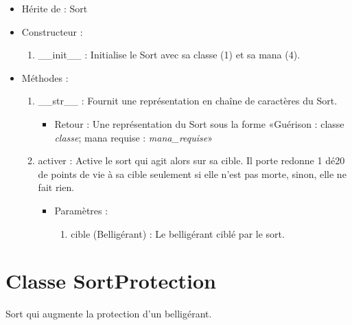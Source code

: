 \documentclass[12pt,pdftex,oneside]{article}
\begin{document}
  \begin{itemize}
  \item Hérite de : Sort


  \item Constructeur : 

  \begin{enumerate}
  \item \_\_init\_\_ : Initialise le Sort avec sa classe (1) et sa mana (4).

  \end{enumerate}

  \item Méthodes : 

    \begin{enumerate}
    \item __str__ : Fournit une représentation en chaîne de caractères du Sort.
      \begin{itemize}
      \item Retour : Une représentation du Sort sous la forme «Guérison : classe \emph{classe}; mana requise : \emph{mana_requise}»
      \end{itemize}
    \item activer : Active le sort qui agit alors sur sa cible. Il porte redonne
      1 dé20 de points de vie à sa cible seulement si elle n'est pas morte, sinon, elle ne fait rien.
      \begin{itemize}
      \item Paramètres : 
        \begin{enumerate}
        \item cible (Belligérant) : Le belligérant ciblé par le sort.
        \end{enumerate}
      \end{itemize}
    \end{enumerate}

  \end{itemize}

  \section {Classe SortProtection}

  Sort qui augmente la protection d'un belligérant.
\end{document}
